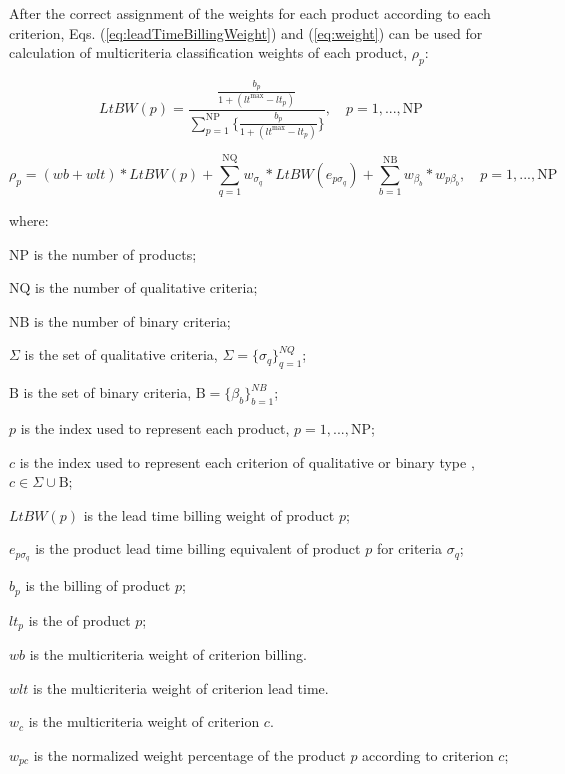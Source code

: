 \documentclass[10pt,fleqn,a4paper,twoside]{article}
\begin{document}
After the correct assignment of the weights for each product according to each criterion, Eqs. (\ref{eq:leadTimeBillingWeight}) and (\ref{eq:weight}) can be used for calculation of multicriteria classification weights of each product, $\rho_{p}$:

\begin{equation}
	\label{eq:leadTimeBillingWeight}
	LtBW(p) = \frac{\frac{b_p}{1 + (lt^{\max} - lt_p)}}{\sum_{p=1}^{\textrm{NP}}{ \{ \frac{b_p}{1 + (lt^{\max} - lt_p)} \} }}, \quad p= 1,...,\textrm{NP}
\end{equation}

\begin{equation}
	\label{eq:weight}
	\rho_{p} = (wb + wlt) * LtBW(p) + \sum_{q=1}^{\textrm{NQ}}{w_{\sigma_q}* LtBW(e_{p\sigma_q})} + \sum_{b=1}^{\textrm{NB}}{w_{\beta_b}*w_{p\beta_b}}, \quad p= 1,...,\textrm{NP}
\end{equation}

where:

$\textrm{NP}$ is the number of products;

$\textrm{NQ}$ is the number of qualitative criteria;

$\textrm{NB}$ is the number of binary criteria;

$\Sigma$ is the set of qualitative criteria, \quad $\Sigma = \{\sigma_q\}_{q=1}^{NQ}$;

$\textrm{B}$ is the set of binary criteria, \quad $\textrm{B} = \{\beta_b\}_{b=1}^{NB}$;

$p$ is the index used to represent each product, \quad $p= 1,...,\textrm{NP}$;

$c$ is the index used to represent each criterion of qualitative or binary type , \quad $c \in \Sigma \cup \textrm{B}$;

$LtBW(p)$ is the lead time billing weight of product $p$;

$e_{p\sigma_q}$ is the product lead time billing equivalent of product $p$ for criteria $\sigma_q$;
 
$b_p$ is the billing of product $p$;

$lt_p$ is the of product $p$;

$wb$ is the multicriteria weight of criterion billing.

$wlt$ is the multicriteria weight of criterion lead time.

$w_{c}$ is the multicriteria weight of criterion $c$.

$w_{pc}$ is the normalized weight percentage of the product $p$ according to criterion $c$;
\end{document}
